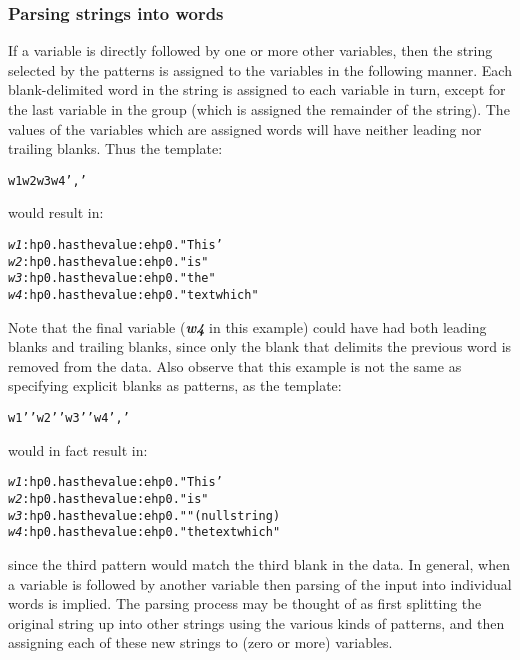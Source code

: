 \subsubsection{Parsing strings into words}
 If a variable is directly followed by one or more other variables,
then the string selected by the patterns is assigned to the variables
in the following manner.
Each blank-delimited word in the string is
assigned to each variable in turn, except for the last variable in the
group (which is assigned the remainder of the string).
The values of the variables which are assigned words will have neither
leading nor trailing blanks.
 Thus the template:
\begin{alltt}
w1 w2 w3 w4 ','
\end{alltt}
would result in:
\begin{alltt}
\emph{w1} :hp0.has the value:ehp0. "This'
\emph{w2} :hp0.has the value:ehp0. "is"
\emph{w3} :hp0.has the value:ehp0. "the"
\emph{w4} :hp0.has the value:ehp0. "text which"
\end{alltt}
Note that the final variable (\textbf{\emph{w4}} in this
example) could have had both leading blanks and trailing blanks, since
only the blank that delimits the previous word is removed from the data.
 Also observe that this example is not the same as specifying
explicit blanks as patterns, as the template:
\begin{alltt}
w1 ' ' w2 ' ' w3 ' ' w4 ','
\end{alltt}
would in fact result in:
\begin{alltt}
\emph{w1} :hp0.has the value:ehp0. "This'
\emph{w2} :hp0.has the value:ehp0. "is"
\emph{w3} :hp0.has the value:ehp0. ""  (null string)
\emph{w4} :hp0.has the value:ehp0. "the text which"
\end{alltt}
since the third pattern would match the third blank in the data.
 In general, when a variable is followed by another variable then
parsing of the input into individual words is implied.
The parsing process may be thought of as first splitting the original
string up into other strings using the various kinds of patterns, and
then assigning each of these new strings to (zero or more) variables.
